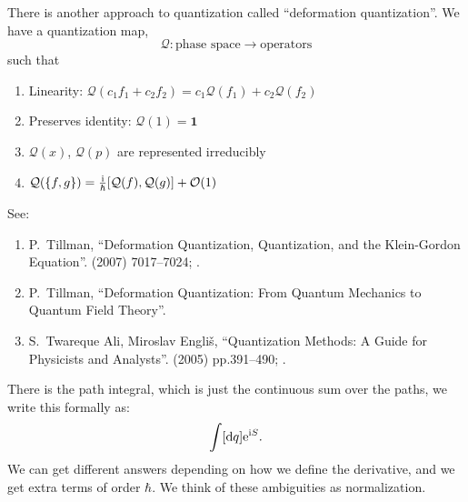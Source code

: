 There is another approach to quantization called ``deformation
quantization''. We have a quantization map,
\begin{equation}
\mathcal{Q}\colon\mbox{phase space}\to\mbox{operators}
\end{equation}
such that
\begin{enumerate}
\item Linearity: $\mathcal{Q}(c_{1}f_{1}+c_{2}f_{2}) = c_{1}\mathcal{Q}(f_{1}) + c_{2}\mathcal{Q}(f_{2})$
\item Preserves identity: $\mathcal{Q}(1)=\mathbf{1}$
\item $\mathcal{Q}(x)$, $\mathcal{Q}(p)$ are represented irreducibly
\item $\mathcal{Q}(\{f,g\}) = \frac{\mathrm{i}}{\hbar}[\mathcal{Q}(f),\mathcal{Q}(g)] + \mathcal{O}(1)$
\end{enumerate}
See:
\begin{enumerate}
\item P.~Tillman, ``Deformation Quantization, Quantization, and the
Klein-Gordon Equation''.
  (2007) 7017--7024; .\\
{\tt{}}
\item P.~Tillman, ``Deformation Quantization: From Quantum Mechanics to
Quantum Field Theory''. 
\item S.~Twareque Ali, Miroslav Engli\v{s},
``Quantization Methods: A Guide for Physicists and Analysts''.
  (2005) pp.391--490;
.\\
{\tt{}}
\end{enumerate}

There is the path integral, which is just the continuous sum over the
paths, we write this formally as:
\begin{equation}
\int[\mathrm{d} q]\mathrm{e}^{\mathrm{i} S}.
\end{equation}
We can get different answers depending on how we define the derivative,
and we get extra terms of order $\hbar$. We think of these ambiguities
as normalization.
